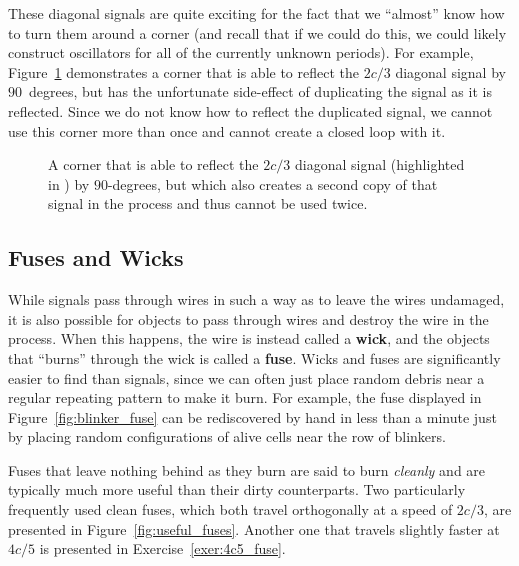 These diagonal signals are quite exciting for the fact that we ``almost'' know how to turn them around a corner (and recall that if we could do this, we could likely construct oscillators for all of the currently unknown periods). For example, Figure~\ref{fig:diagonal_2c3_almost_elbow} demonstrates a corner that is able to reflect the $2c/3$ diagonal signal by $90$~degrees, but has the unfortunate side-effect of duplicating the signal as it is reflected. Since we do not know how to reflect the duplicated signal, we cannot use this corner more than once and cannot create a closed loop with it.

\begin{figure}[!htb]
	\centering{}
	\caption{A corner that is able to reflect the $2c/3$ diagonal signal (highlighted in ) by $90$-degrees, but which also creates a second copy of that signal in the process and thus cannot be used twice.}\label{fig:diagonal_2c3_almost_elbow}
\end{figure}


\subsection{Fuses and Wicks}\label{sec:fuses}

While signals pass through wires in such a way as to leave the wires undamaged, it is also possible for objects to pass through wires and destroy the wire in the process. When this happens, the wire is instead called a \textbf{wick}, and the objects that ``burns'' through the wick is called a \textbf{fuse}. Wicks and fuses are significantly easier to find than signals, since we can often just place random debris near a regular repeating pattern to make it burn. For example, the fuse displayed in Figure~\ref{fig:blinker_fuse} can be rediscovered by hand in less than a minute just by placing random configurations of alive cells near the row of blinkers.

Fuses that leave nothing behind as they burn are said to burn \emph{cleanly} and are typically much more useful than their dirty counterparts. Two particularly frequently used clean fuses, which both travel orthogonally at a speed of $2c/3$, are presented in Figure~\ref{fig:useful_fuses}. Another one that travels slightly faster at $4c/5$ is presented in Exercise~\ref{exer:4c5_fuse}.

